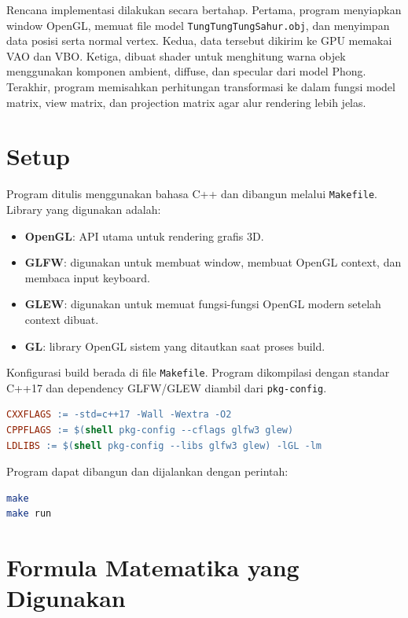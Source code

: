 \documentclass[12pt,a4paper]{article}
\begin{document}
Rencana implementasi dilakukan secara bertahap. Pertama, program menyiapkan
window OpenGL, memuat file model \texttt{TungTungTungSahur.obj}, dan menyimpan
data posisi serta normal vertex. Kedua, data tersebut dikirim ke GPU memakai
VAO dan VBO. Ketiga, dibuat shader untuk menghitung warna objek menggunakan
komponen ambient, diffuse, dan specular dari model Phong. Terakhir, program
memisahkan perhitungan transformasi ke dalam fungsi model matrix, view matrix,
dan projection matrix agar alur rendering lebih jelas.

\section{Setup}

Program ditulis menggunakan bahasa C++ dan dibangun melalui \texttt{Makefile}.
Library yang digunakan adalah:

\begin{itemize}
    \item \textbf{OpenGL}: API utama untuk rendering grafis 3D.
    \item \textbf{GLFW}: digunakan untuk membuat window, membuat OpenGL context,
    dan membaca input keyboard.
    \item \textbf{GLEW}: digunakan untuk memuat fungsi-fungsi OpenGL modern
    setelah context dibuat.
    \item \textbf{GL}: library OpenGL sistem yang ditautkan saat proses build.
\end{itemize}

Konfigurasi build berada di file \texttt{Makefile}. Program dikompilasi dengan
standar C++17 dan dependency GLFW/GLEW diambil dari \texttt{pkg-config}.

\begin{lstlisting}[language=make]
CXXFLAGS := -std=c++17 -Wall -Wextra -O2
CPPFLAGS := $(shell pkg-config --cflags glfw3 glew)
LDLIBS := $(shell pkg-config --libs glfw3 glew) -lGL -lm
\end{lstlisting}

Program dapat dibangun dan dijalankan dengan perintah:

\begin{lstlisting}[language=bash]
make
make run
\end{lstlisting}

\section{Formula Matematika yang Digunakan}
\end{document}

